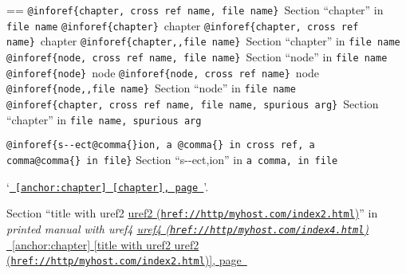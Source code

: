 \documentclass{book}
\makeatletter
\newenvironment{Texinfopreformatted}{%
  \par\GNUTobeylines\obeyspaces\frenchspacing\parskip=\z@\parindent=\z@}{}
{\catcode`\^^M=13 \gdef\GNUTobeylines{\catcode`\^^M=13 \def^^M{\null\par}}}
\newenvironment{Texinfoindented}{\begin{list}{}{}\item\relax}{\end{list}}
\renewcommand{\_}{\Texinfounderscore\discretionary{}{}{}}
\makeatother
\begin{document}
\begin{Texinfoindented}
\begin{Texinfopreformatted}
\texttt{@inforef\{chapter,\ cross ref name,\ file name\}}\ Section ``chapter'' in \texttt{file name}
\texttt{@inforef\{chapter\}}\ chapter
\texttt{@inforef\{chapter,\ cross ref name\}}\ chapter
\texttt{@inforef\{chapter{,}{,}file name\}}\ Section ``chapter'' in \texttt{file name}
\texttt{@inforef\{node,\ cross ref name,\ file name\}}\ Section ``node'' in \texttt{file name}
\texttt{@inforef\{node\}}\ node
\texttt{@inforef\{node,\ cross ref name\}}\ node
\texttt{@inforef\{node{,}{,}file name\}}\ Section ``node'' in \texttt{file name}
\texttt{@inforef\{chapter,\ cross ref name,\ file name,\ spurious arg\}}\ Section ``chapter'' in \texttt{file name,\ spurious arg}

\texttt{@inforef\{s{-}{-}ect@comma\{\}ion,\ a @comma\{\}\ in cross
ref,\ a comma@comma\{\}\ in file\}}
Section ``s{-}{-}ect,ion'' in \texttt{a comma,\ in file}

`\texttt{\hyperref[anchor:chapter]{\chaptername~\ref*{anchor:chapter} [chapter], page~\pageref*{anchor:chapter}}}'.

Section ``title with uref2 \href{href://http/myhost.com/index2.html}{uref2 (\nolinkurl{href://http/myhost.com/index2.html})}'' in \textsl{printed manual with uref4 \href{href://http/myhost.com/index4.html}{uref4 (\nolinkurl{href://http/myhost.com/index4.html})}}
\hyperref[anchor:chapter]{\chaptername~\ref*{anchor:chapter} [title with uref2 \href{href://http/myhost.com/index2.html}{uref2 (\nolinkurl{href://http/myhost.com/index2.html})}], page~\pageref*{anchor:chapter}}


\end{Texinfopreformatted}
\end{Texinfoindented}
\end{document}
